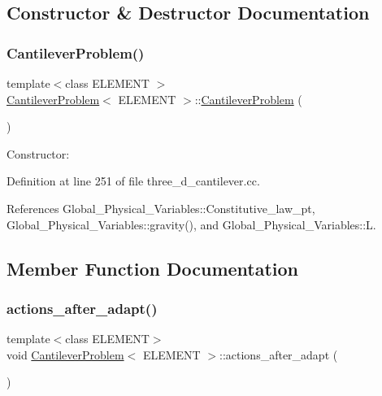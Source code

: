 \subsection{Constructor \& Destructor Documentation}
\mbox{\label{classCantileverProblem_abba97fc4b8402bc0363fdf16322f6572}} 
\subsubsection{\texorpdfstring{Cantilever\+Problem()}{CantileverProblem()}}
{\footnotesize\ttfamily template$<$class E\+L\+E\+M\+E\+NT $>$ \\
\hyperlink{classCantileverProblem}{Cantilever\+Problem}$<$ E\+L\+E\+M\+E\+NT $>$\+::\hyperlink{classCantileverProblem}{Cantilever\+Problem} (\begin{DoxyParamCaption}{ }\end{DoxyParamCaption})}



Constructor\+: 



Definition at line 251 of file three\+\_\+d\+\_\+cantilever.\+cc.



References Global\+\_\+\+Physical\+\_\+\+Variables\+::\+Constitutive\+\_\+law\+\_\+pt, Global\+\_\+\+Physical\+\_\+\+Variables\+::gravity(), and Global\+\_\+\+Physical\+\_\+\+Variables\+::L.



\subsection{Member Function Documentation}
\mbox{\label{classCantileverProblem_af4d135ace3eac657b38de362e1644c75}} 
\subsubsection{\texorpdfstring{actions\+\_\+after\+\_\+adapt()}{actions\_after\_adapt()}}
{\footnotesize\ttfamily template$<$class E\+L\+E\+M\+E\+NT$>$ \\
void \hyperlink{classCantileverProblem}{Cantilever\+Problem}$<$ E\+L\+E\+M\+E\+NT $>$\+::actions\+\_\+after\+\_\+adapt (\begin{DoxyParamCaption}{ }\end{DoxyParamCaption})\hspace{0.3cm}{\ttfamily [inline]}}



